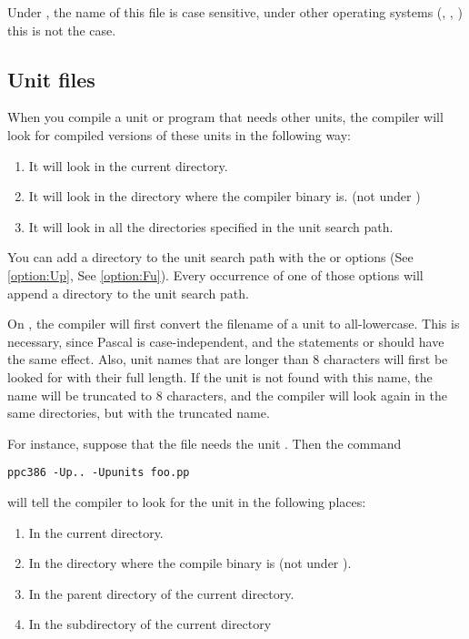 \documentclass{report}
\newcommand{\seeo}[1]{See \ref{option:#1}}
\begin{document}
Under \linux, the name of this file is case sensitive, under other operating 
systems (\dos, \windowsnt, \ostwo) this is not the case.

\subsection{Unit files}

When you compile a unit or program that needs other units, the compiler will
look for compiled versions of these units in the following way:
\begin{enumerate}
\item It will look in the current directory.
\item It will look in the directory where the compiler binary is. 
(not under \linux)
\item It will look in all the directories specified in the unit search path.
\end{enumerate}
You can add a directory to the unit search path with the  or 
 options (\seeo{Up}, \seeo{Fu}). Every occurrence of one of
those options will append a directory to the unit search path.

On \linux, the compiler will first convert the filename of a unit to
all-lowercase. This is necessary, since Pascal is case-independent, and
the statements  or  should have the same
effect.
Also, unit names that are longer than 8 characters will first be looked for
with their full length. If the unit is not found with this name, the name
will be truncated to 8 characters, and the compiler will look again in the
same directories, but with the truncated name.

For instance, suppose that the file  needs the unit
. Then the command 
\begin{verbatim}
ppc386 -Up.. -Upunits foo.pp
\end{verbatim}
will tell the compiler to look for the unit  in the following 
places:
\begin{enumerate}
\item In the current directory.
\item In the directory where the compile binary is (not under \linux).
\item In the parent directory of the current directory. 
\item In the subdirectory  of the current directory
\end{enumerate}
\end{document}

